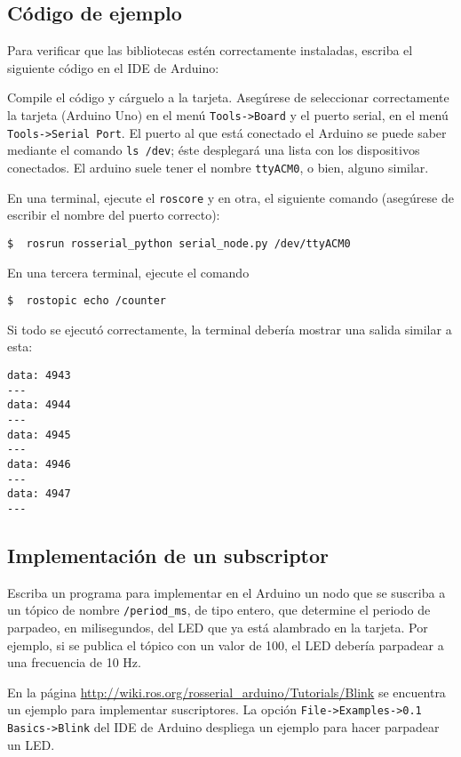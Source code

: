 \documentclass[a4paper,12pt]{article}
\begin{document}
\subsection{Código de ejemplo}

Para verificar que las bibliotecas estén correctamente instaladas, escriba el siguiente código en el IDE de Arduino:


Compile el código y cárguelo a la tarjeta. Asegúrese de seleccionar correctamente la tarjeta (Arduino Uno) en el menú \texttt{Tools->Board} y el puerto serial, en el menú \texttt{Tools->Serial Port}. El puerto al que está conectado el Arduino se puede saber mediante el comando \texttt{ls /dev}; éste desplegará una lista con los dispositivos conectados. El arduino suele tener el nombre \texttt{ttyACM0}, o bien, alguno similar. 

En una terminal, ejecute el \texttt{roscore} y en otra, el siguiente comando (asegúrese de escribir el nombre del puerto correcto):
\begin{lstlisting}
$  rosrun rosserial_python serial_node.py /dev/ttyACM0
\end{lstlisting}

En una tercera terminal, ejecute el comando
\begin{lstlisting}
$  rostopic echo /counter
\end{lstlisting}

Si todo se ejecutó correctamente, la terminal debería mostrar una salida similar a esta:
\begin{verbatim}
data: 4943
---
data: 4944
---
data: 4945
---
data: 4946
---
data: 4947
---
\end{verbatim}

\subsection{Implementación de un subscriptor}
\label{sec:subscriber}

Escriba un programa para implementar en el Arduino un nodo que se suscriba a un tópico de nombre \texttt{/period\_ms}, de tipo entero, que determine el periodo de parpadeo, en milisegundos, del LED que ya está alambrado en la tarjeta. Por ejemplo, si se publica el tópico con un valor de 100, el LED debería parpadear a una frecuencia de 10 Hz. 

En la página \url{http://wiki.ros.org/rosserial_arduino/Tutorials/Blink} se encuentra un ejemplo para implementar suscriptores. La opción \texttt{File->Examples->0.1 Basics->Blink} del IDE de Arduino despliega un ejemplo para hacer parpadear un LED. 
\end{document}
